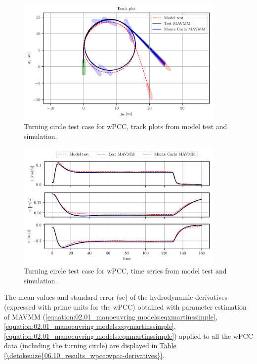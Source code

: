 \begin{figure}[ht]
\centering
\includegraphics[width=0.90\textwidth]{kappa/images/11.pdf}
\caption{Turning circle test case for wPCC, track plots from model test and simulation.}\label{\detokenize{06.10_results_wpcc:fig-track-plot-testing-sim}}\end{figure}
\begin{figure}[ht!]
\centering
\includegraphics[width=0.90\textwidth]{kappa/images/12.pdf}
\caption{Turning circle test case for wPCC, time series from model test and simulation.}\label{\detokenize{06.10_results_wpcc:fig-testing-sim}}\end{figure}
\clearpage
\noindent The mean values and standard error (se) of the hydrodynamic derivatives (expressed with prime units for the wPCC) obtained with parameter estimation of MAVMM (\autoref{equation:02.01_manoeuvring models:eqxmartinssimple}, \autoref{equation:02.01_manoeuvring models:eqymartinssimple},  \autoref{equation:02.01_manoeuvring models:eqnmartinssimple}) applied to all the wPCC data (including the turning circle)  are displayed in \hyperref[\detokenize{06.10_results_wpcc:wpcc-derivatives}]{Table \ref{\detokenize{06.10_results_wpcc:wpcc-derivatives}}}.

\clearpage
